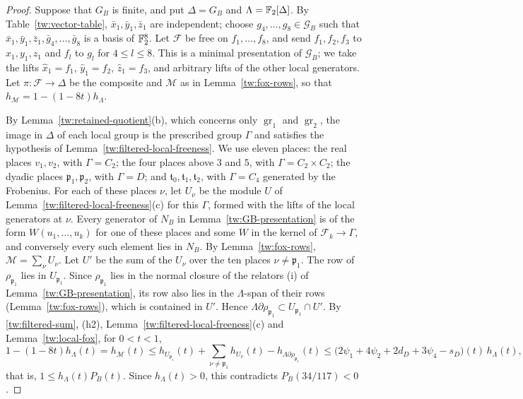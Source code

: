 \begin{proof}
Suppose that $G_B$ is finite, and put $\Delta=G_B$ and
$\Lambda=\mathbb F_2[\Delta]$. By Table~\ref{tw:vector-table},
$\bar x_1,\bar y_1,\bar z_1$ are independent; choose
$g_4,\dots,g_8\in\mathcal G_B$ such that
$\bar x_1,\bar y_1,\bar z_1,\bar g_4,\dots,\bar g_8$ is a basis of
$\mathbb F_2^8$. Let $\mathcal F$ be free on $f_1,\dots,f_8$, and send
$f_1,f_2,f_3$ to $x_1,y_1,z_1$ and $f_l$ to $g_l$ for $4\le l\le8$. This is a
minimal presentation of
$\mathcal G_B$; we take the lifts $\hat x_1=f_1$, $\hat y_1=f_2$,
$\hat z_1=f_3$, and arbitrary lifts of the other local generators. Let
$\pi\colon\mathcal F\to\Delta$ be the composite and $\mathcal M$ as in
Lemma~\ref{tw:fox-rows}, so that $h_{\mathcal M}=1-(1-8t)h_\Lambda$.

By Lemma~\ref{tw:retained-quotient}(b), which concerns only
$\operatorname{gr}_1$ and $\operatorname{gr}_2$, the image in $\Delta$ of each
local group is the prescribed group $\Gamma$ and satisfies the hypothesis of
Lemma~\ref{tw:filtered-local-freeness}. We use eleven places: the real
places $v_1,v_2$, with $\Gamma=C_2$; the four places above $3$ and $5$, with
$\Gamma=C_2\times C_2$; the dyadic places $\mathfrak p_1,\mathfrak p_2$, with
$\Gamma=D$; and $\mathfrak t_0,\mathfrak t_1,\mathfrak t_2$, with $\Gamma=C_4$
generated by the Frobenius. For each of these places $\nu$, let $U_\nu$ be
the module $U$ of Lemma~\ref{tw:filtered-local-freeness}(c) for this $\Gamma$,
formed with the lifts of the local generators at $\nu$. Every generator of
$N_B$ in Lemma~\ref{tw:GB-presentation} is of the form $W(u_1,\dots,u_k)$ for
one of these places and some $W$ in the kernel of $\mathcal F_k\to\Gamma$, and
conversely every such element lies in $N_B$. By Lemma~\ref{tw:fox-rows},
$\mathcal M=\sum_\nu U_\nu$. Let $U'$ be the sum of the $U_\nu$ over the ten
places $\nu\ne\mathfrak p_1$. The row of $\rho_{\mathfrak p_1}$ lies in
$U_{\mathfrak p_1}$. Since $\rho_{\mathfrak p_1}$ lies in the normal closure of
the relators (i) of Lemma~\ref{tw:GB-presentation}, its row also lies in the
$\Lambda$-span of their rows (Lemma~\ref{tw:fox-rows}), which is contained in
$U'$. Hence $\Lambda\partial\rho_{\mathfrak p_1}\subset U_{\mathfrak p_1}\cap U'$.
By \eqref{tw:filtered-sum}, (h2), Lemma~\ref{tw:filtered-local-freeness}(c)
and Lemma~\ref{tw:local-fox}, for $0<t<1$,
\[
 1-(1-8t)h_\Lambda(t)=h_{\mathcal M}(t)
 \le h_{U_{\mathfrak p_1}}(t)+\sum_{\nu\ne\mathfrak p_1}h_{U_\nu}(t)
 -h_{\Lambda\partial\rho_{\mathfrak p_1}}(t)
 \le\bigl(2\psi_1+4\psi_2+2d_D+3\psi_4-s_D\bigr)(t)\,h_\Lambda(t),
\]
that is, $1\le h_\Lambda(t)P_B(t)$. Since $h_\Lambda(t)>0$, this contradicts
$P_B(34/117)<0$.
\end{proof}

